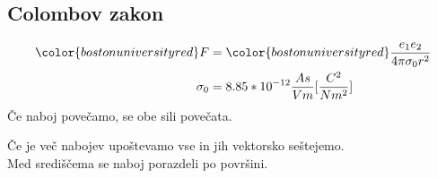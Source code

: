 {\color{indiagreen}\subsection{Colombov zakon}}
\begin{align*}
    {\color{bostonuniversityred}F} &= {\color{bostonuniversityred}\frac{e_1 e_2}{4\pi \sigma_0 r^2}}\\
    \sigma_0 &= 8.85 * 10^{-12} \frac{As}{Vm}[\frac{C^2}{Nm^2}]\\
\end{align*}
Če naboj povečamo, se obe sili povečata.\\
Če je več nabojev upoštevamo vse in jih vektorsko seštejemo.\\
Med središčema se naboj porazdeli po površini.
